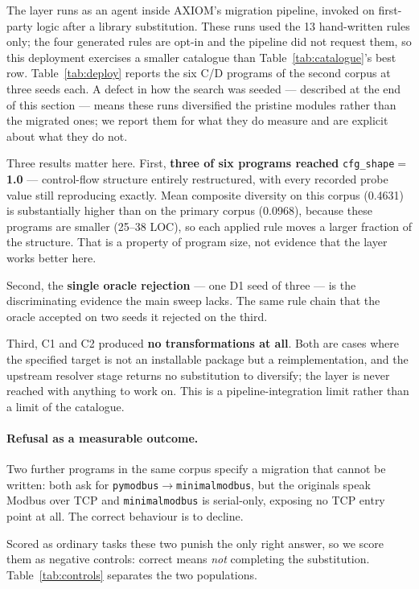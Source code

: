 \documentclass[10pt,twocolumn]{article}
\newcommand{\code}[1]{\texttt{\small #1}}
\begin{document}
The layer runs as an agent inside AXIOM's migration pipeline, invoked on
first-party logic after a library substitution. These runs used the 13
hand-written rules only; the four generated rules are opt-in and the pipeline
did not request them, so this deployment exercises a smaller catalogue than
Table~\ref{tab:catalogue}'s best row. Table~\ref{tab:deploy} reports
the six C/D programs of the second corpus at three seeds each. A defect in how
the search was seeded --- described at the end of this section --- means these
runs diversified the pristine modules rather than the migrated ones; we report
them for what they do measure and are explicit about what they do not.

Three results matter here. First, \textbf{three of six programs reached}
\code{cfg\_shape}${}={}$\textbf{1.0} --- control-flow structure entirely
restructured, with every recorded probe value still reproducing exactly. Mean
composite diversity on this corpus (0.4631) is substantially higher than on the
primary corpus (0.0968), because these programs are smaller (25--38 LOC), so
each applied rule moves a larger fraction of the structure. That is a property
of program size, not evidence that the layer works better here.

Second, the \textbf{single oracle rejection} --- one D1 seed of three --- is the
discriminating evidence the main sweep lacks. The same rule chain that the
oracle accepted on two seeds it rejected on the third.

Third, C1 and C2 produced \textbf{no transformations at all}. Both are cases
where the specified target is not an installable package but a
reimplementation, and the upstream resolver stage returns no substitution to
diversify; the layer is never reached with anything to work on. This is a
pipeline-integration limit rather than a limit of the catalogue.

\paragraph{Refusal as a measurable outcome.} Two further programs in the same
corpus specify a migration that cannot be written: both ask for
\code{pymodbus}${\rightarrow}$\code{minimalmodbus}, but the originals speak
Modbus over TCP and \code{minimalmodbus} is serial-only, exposing no TCP entry
point at all. The correct behaviour is to decline.

Scored as ordinary tasks these two punish the only right answer, so we score
them as negative controls: correct means \emph{not} completing the
substitution. Table~\ref{tab:controls} separates the two populations.
\end{document}
